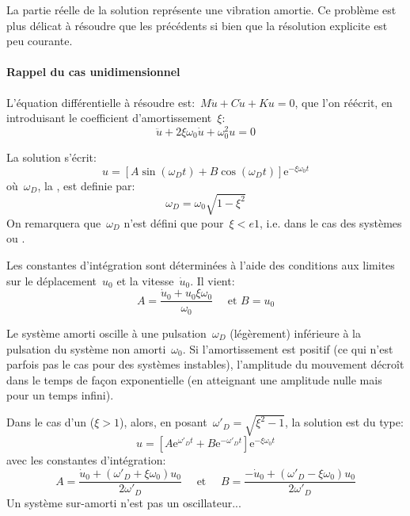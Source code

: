 La partie réelle de la solution représente une vibration amortie.
Ce problème est plus délicat à résoudre que les précédents si bien que la résolution
explicite est peu courante.

\medskip
{}
\paragraph{Rappel du cas unidimensionnel}
L'équation différentielle à résoudre est:~$M\ddot{u}+C\dot{u}+Ku=0$, que l'on
réécrit, en introduisant le coefficient d'amortissement~$\xi$:
\begin{equation}\ddot{u}+2\xi\omega_0\dot{u}+\omega^2_0 u=0\end{equation}

La solution s'écrit: \begin{equation} u=\left[A\sin (\omega_D t)+B\cos(\omega_D t)\right] \mathrm{e}^{-\xi\omega_0t} \end{equation}
où~$\omega_D$, la , est definie par:
\begin{equation}\omega_D=\omega_0\sqrt{1-\xi^2}\end{equation}
On remarquera que~$\omega_D$ n'est défini que pour~$\xi<e1$, i.e.
dans le cas des systèmes  ou .

Les constantes d'intégration sont déterminées à l'aide des conditions aux limites sur le déplacement~$u_0$ et la
vitesse~$\dot{u}_0$. Il vient: \begin{equation} A=\dfrac{\dot{u}_0+u_0\xi\omega_0}{\omega_0} \quad \text{ et } B=u_0\end{equation}

Le système amorti oscille à une pulsation~$\omega_D$ (légèrement) inférieure à la pulsation du
système non amorti~$\omega_0$. Si l'amortissement est positif (ce qui n’est parfois pas le cas
pour des systèmes instables), l'amplitude du mouvement décroît dans le temps de façon
exponentielle (en atteignant une amplitude nulle mais pour un temps infini).

\medskip
Dans le cas d'un  ($\xi>1$), alors, en posant~$\omega'_D=\sqrt{\xi^2-1}$, la solution est du type:
\begin{equation} u=\left[A\mathrm{e}^{\omega'_D t}+B\mathrm{e}^{-\omega'_D t}\right] \mathrm{e}^{-\xi\omega_0t} \end{equation}
avec les constantes d'intégration:
\begin{equation}A=\dfrac{\dot{u}_0+(\omega'_D+\xi\omega_0)u_0}{2\omega'_D} \quad \text{ et }\quad
B=\dfrac{-\dot{u}_0+(\omega'_D-\xi\omega_0)u_0}{2\omega'_D} \end{equation}
Un système sur-amorti n'est pas un oscillateur...

